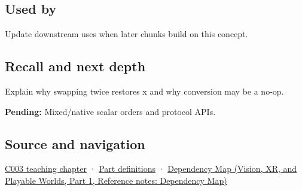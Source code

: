 \subsection{Used by}\label{appendix-11ba36693aa2-used-by}

\hypertarget{appendix-11ba36693aa2-used-by}{}

Update downstream uses when later chunks build on this concept.

\subsection{Recall and next depth}\label{appendix-11ba36693aa2-recall-and-next-depth}

\hypertarget{appendix-11ba36693aa2-recall-and-next-depth}{}

Explain why swapping twice restores x and why conversion may be a no-op.

\textbf{Pending:} Mixed/native scalar orders and protocol APIs.

\subsection{Source and navigation}\label{appendix-11ba36693aa2-source-and-navigation}

\hypertarget{appendix-11ba36693aa2-source-and-navigation}{}

\hyperref[01-foundations-i-ch002-where-the-bytes-live]{C003 teaching chapter} · \hyperref[appendix-fd090d982a15-m003---parts-41-60]{Part definitions} · \href{../07-Vision-XR-and-Playable-Worlds-P01/main.pdf\#nameddest=appendix-4ad47bdd269a}{Dependency Map (Vision, XR, and Playable Worlds, Part 1, Reference notes: Dependency Map)}
